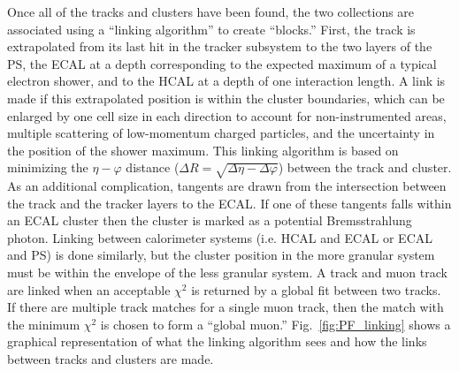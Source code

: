 Once all of the tracks and clusters have been found, the two collections are associated using a ``linking algorithm'' to create ``blocks.''
First, the track is extrapolated from its last hit in the tracker subsystem to the two layers of the PS, the ECAL at a depth corresponding to the expected maximum of a typical electron shower, and to the HCAL at a depth of one interaction length.
A link is made if this extrapolated position is within the cluster boundaries, which can be enlarged by one cell size in each direction to account for non-instrumented areas, multiple scattering of low-momentum charged particles, and the uncertainty in the position of the shower maximum.
This linking algorithm is based on minimizing the $\eta-\varphi$ distance ($\Delta{R}=\sqrt{\Delta\eta-\Delta\varphi}$) between the track and cluster.
As an additional complication, tangents are drawn from the intersection between the track and the tracker layers to the ECAL.
If one of these tangents falls within an ECAL cluster then the cluster is marked as a potential Bremsstrahlung photon.
Linking between calorimeter systems (i.e. HCAL and ECAL or ECAL and PS) is done similarly, but the cluster position in the more granular system must be within the envelope of the less granular system.
A track and muon track are linked when an acceptable $\chi^{2}$ is returned by a global fit between two tracks.
If there are multiple track matches for a single muon track, then the match with the minimum $\chi^{2}$ is chosen to form a ``global muon.''
Fig.~\ref{fig:PF_linking} shows a graphical representation of what the linking algorithm sees and how the links between tracks and clusters are made.


